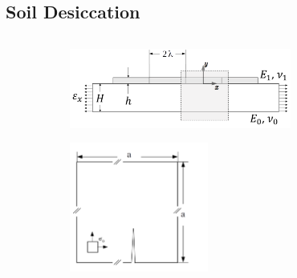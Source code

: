 \subsection{Soil Desiccation}

\subsectioncover

\begin{frame}{}
\vspace{-1.5em}
\begin{columns}
    \begin{column}{0.3\textwidth}
        \begin{figure}[htb!]
            \centering
            \begin{subfigure}[b]{\textwidth}
                \centering
                \includegraphics[width=0.8\textwidth]{past/figures/1D_schematic.png}
                \caption{}
            \end{subfigure}

            \begin{subfigure}[b]{\textwidth}
                \centering
                \includegraphics[width=0.5\textwidth]{past/figures/2D_schematic.png}
                \caption{}
            \end{subfigure}


\end{figure}
\end{column}
\end{columns}
\end{frame}
